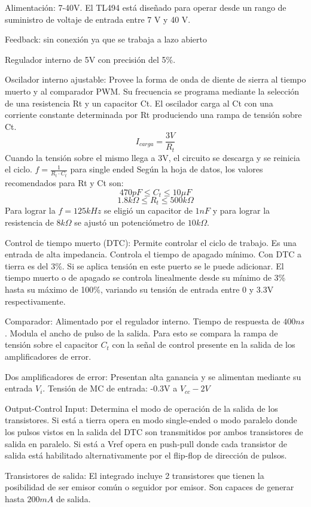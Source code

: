 Alimentación: 7-40V.
El TL494 está diseñado para operar desde un rango de suministro de voltaje de entrada entre 7 V y 40 V.

Feedback: sin conexión ya que se trabaja a lazo abierto

Regulador interno de 5V con precisión del 5\%. 

Oscilador interno ajustable:
Provee la forma de onda de diente de sierra al tiempo muerto y al comparador PWM. 
Su frecuencia se programa mediante la selección de una resistencia Rt y un capacitor Ct. 
El oscilador carga al Ct con una corriente constante determinada por Rt produciendo una rampa de tensión sobre Ct.
$$ I_{carga}=\frac{3V}{R_t} $$
Cuando la tensión sobre el mismo llega a 3V, el circuito se descarga y se reinicia el ciclo. 
$f=\frac{1}{R_t\cdot C_t}$ para single ended 
Según la hoja de datos, los valores recomendados para Rt y Ct son:
$$470pF\leq C_t\leq 10\mu F$$
$$1.8k\Omega\leq R_t\leq 500k\Omega$$
Para lograr la $f=125kHz$ se eligió un capacitor de $1nF$ y para lograr la resistencia de $8k\Omega$ se ajustó un potenciómetro de $10k\Omega$. 

Control de tiempo muerto (DTC):
Permite controlar el ciclo de trabajo. 
Es una entrada de alta impedancia. 
Controla el tiempo de apagado mínimo. Con DTC a tierra es del 3\%.
Si se aplica tensión en este puerto se le puede adicionar.
El tiempo muerto o de apagado se controla linealmente desde su mínimo de 3\% hasta su máximo de 100\%, 
variando su tensión de entrada entre 0 y 3.3V respectivamente. 

Comparador:
Alimentado por el regulador interno. 
Tiempo de respuesta de $400ns$. 
Modula el ancho de pulso de la salida. Para esto se compara la rampa de tensión sobre el capacitor $C_t$ con la señal de control
presente en la salida de los amplificadores de error. 

Dos amplificadores de error:
Presentan alta ganancia y se alimentan mediante su entrada $V_i$. 
Tensión de MC de entrada: -0.3V a $V_{cc}-2V$

Output-Control Input:
Determina el modo de operación de la salida de los transistores. 
Si está a tierra opera en modo single-ended o modo paralelo donde los pulsos vistos en la salida del DTC son transmitidos por ambos transistores de salida en paralelo.
Si está a Vref opera en push-pull donde cada transistor de salida está habilitado alternativamente por el flip-flop de dirección de pulsos.

Transistores de salida:
El integrado incluye 2 transistores que tienen la posibilidad de ser emisor común o seguidor por emisor. 
Son capaces de generar hasta $200mA$ de salida. 

